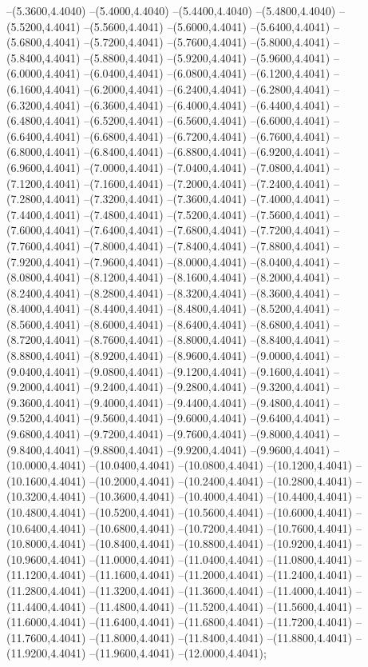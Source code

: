 {	--(5.3600,4.4040)
	--(5.4000,4.4040)
	--(5.4400,4.4040)
	--(5.4800,4.4040)
	--(5.5200,4.4041)
	--(5.5600,4.4041)
	--(5.6000,4.4041)
	--(5.6400,4.4041)
	--(5.6800,4.4041)
	--(5.7200,4.4041)
	--(5.7600,4.4041)
	--(5.8000,4.4041)
	--(5.8400,4.4041)
	--(5.8800,4.4041)
	--(5.9200,4.4041)
	--(5.9600,4.4041)
	--(6.0000,4.4041)
	--(6.0400,4.4041)
	--(6.0800,4.4041)
	--(6.1200,4.4041)
	--(6.1600,4.4041)
	--(6.2000,4.4041)
	--(6.2400,4.4041)
	--(6.2800,4.4041)
	--(6.3200,4.4041)
	--(6.3600,4.4041)
	--(6.4000,4.4041)
	--(6.4400,4.4041)
	--(6.4800,4.4041)
	--(6.5200,4.4041)
	--(6.5600,4.4041)
	--(6.6000,4.4041)
	--(6.6400,4.4041)
	--(6.6800,4.4041)
	--(6.7200,4.4041)
	--(6.7600,4.4041)
	--(6.8000,4.4041)
	--(6.8400,4.4041)
	--(6.8800,4.4041)
	--(6.9200,4.4041)
	--(6.9600,4.4041)
	--(7.0000,4.4041)
	--(7.0400,4.4041)
	--(7.0800,4.4041)
	--(7.1200,4.4041)
	--(7.1600,4.4041)
	--(7.2000,4.4041)
	--(7.2400,4.4041)
	--(7.2800,4.4041)
	--(7.3200,4.4041)
	--(7.3600,4.4041)
	--(7.4000,4.4041)
	--(7.4400,4.4041)
	--(7.4800,4.4041)
	--(7.5200,4.4041)
	--(7.5600,4.4041)
	--(7.6000,4.4041)
	--(7.6400,4.4041)
	--(7.6800,4.4041)
	--(7.7200,4.4041)
	--(7.7600,4.4041)
	--(7.8000,4.4041)
	--(7.8400,4.4041)
	--(7.8800,4.4041)
	--(7.9200,4.4041)
	--(7.9600,4.4041)
	--(8.0000,4.4041)
	--(8.0400,4.4041)
	--(8.0800,4.4041)
	--(8.1200,4.4041)
	--(8.1600,4.4041)
	--(8.2000,4.4041)
	--(8.2400,4.4041)
	--(8.2800,4.4041)
	--(8.3200,4.4041)
	--(8.3600,4.4041)
	--(8.4000,4.4041)
	--(8.4400,4.4041)
	--(8.4800,4.4041)
	--(8.5200,4.4041)
	--(8.5600,4.4041)
	--(8.6000,4.4041)
	--(8.6400,4.4041)
	--(8.6800,4.4041)
	--(8.7200,4.4041)
	--(8.7600,4.4041)
	--(8.8000,4.4041)
	--(8.8400,4.4041)
	--(8.8800,4.4041)
	--(8.9200,4.4041)
	--(8.9600,4.4041)
	--(9.0000,4.4041)
	--(9.0400,4.4041)
	--(9.0800,4.4041)
	--(9.1200,4.4041)
	--(9.1600,4.4041)
	--(9.2000,4.4041)
	--(9.2400,4.4041)
	--(9.2800,4.4041)
	--(9.3200,4.4041)
	--(9.3600,4.4041)
	--(9.4000,4.4041)
	--(9.4400,4.4041)
	--(9.4800,4.4041)
	--(9.5200,4.4041)
	--(9.5600,4.4041)
	--(9.6000,4.4041)
	--(9.6400,4.4041)
	--(9.6800,4.4041)
	--(9.7200,4.4041)
	--(9.7600,4.4041)
	--(9.8000,4.4041)
	--(9.8400,4.4041)
	--(9.8800,4.4041)
	--(9.9200,4.4041)
	--(9.9600,4.4041)
	--(10.0000,4.4041)
	--(10.0400,4.4041)
	--(10.0800,4.4041)
	--(10.1200,4.4041)
	--(10.1600,4.4041)
	--(10.2000,4.4041)
	--(10.2400,4.4041)
	--(10.2800,4.4041)
	--(10.3200,4.4041)
	--(10.3600,4.4041)
	--(10.4000,4.4041)
	--(10.4400,4.4041)
	--(10.4800,4.4041)
	--(10.5200,4.4041)
	--(10.5600,4.4041)
	--(10.6000,4.4041)
	--(10.6400,4.4041)
	--(10.6800,4.4041)
	--(10.7200,4.4041)
	--(10.7600,4.4041)
	--(10.8000,4.4041)
	--(10.8400,4.4041)
	--(10.8800,4.4041)
	--(10.9200,4.4041)
	--(10.9600,4.4041)
	--(11.0000,4.4041)
	--(11.0400,4.4041)
	--(11.0800,4.4041)
	--(11.1200,4.4041)
	--(11.1600,4.4041)
	--(11.2000,4.4041)
	--(11.2400,4.4041)
	--(11.2800,4.4041)
	--(11.3200,4.4041)
	--(11.3600,4.4041)
	--(11.4000,4.4041)
	--(11.4400,4.4041)
	--(11.4800,4.4041)
	--(11.5200,4.4041)
	--(11.5600,4.4041)
	--(11.6000,4.4041)
	--(11.6400,4.4041)
	--(11.6800,4.4041)
	--(11.7200,4.4041)
	--(11.7600,4.4041)
	--(11.8000,4.4041)
	--(11.8400,4.4041)
	--(11.8800,4.4041)
	--(11.9200,4.4041)
	--(11.9600,4.4041)
	--(12.0000,4.4041);
}
